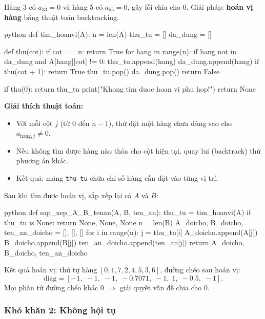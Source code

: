\documentclass[12pt,a4paper]{article}
\begin{document}
Hàng 3 có $a_{33}=0$ và hàng 5 có $a_{55}=0$, gây lỗi chia cho 0. Giải pháp: \textbf{hoán vị hàng} bằng thuật toán backtracking.

\begin{mintedbox}{python}
def tim_hoanvi(A):
    n = len(A)
    thu_tu = []
    da_dung = []

    def thu(cot):
        if cot == n:
            return True
        for hang in range(n):
            if hang not in da_dung and A[hang][cot] != 0:
                thu_tu.append(hang)
                da_dung.append(hang)
                if thu(cot + 1):
                    return True
                thu_tu.pop()
                da_dung.pop()
        return False

    if thu(0):
        return thu_tu
    print("Khong tim duoc hoan vi phu hop!")
    return None
\end{mintedbox}

\textbf{Giải thích thuật toán:}
\begin{itemize}
    \item Với mỗi cột $j$ (từ 0 đến $n-1$), thử đặt một hàng chưa dùng sao cho $a_{\text{hàng},j}\neq 0$.
    \item Nếu không tìm được hàng nào thỏa cho cột hiện tại, quay lui (backtrack) thử phương án khác.
    \item Kết quả: mảng \texttt{thu\_tu} chứa chỉ số hàng cần đặt vào từng vị trí.
\end{itemize}

Sau khi tìm được hoán vị, sắp xếp lại cả $A$ và $B$:

\begin{mintedbox}{python}
def sap_xep_A_B_tenan(A, B, ten_an):
    thu_tu = tim_hoanvi(A)
    if thu_tu is None:
        return None, None, None
    n = len(B)
    A_doicho, B_doicho, ten_an_doicho = [], [], []
    for i in range(n):
        j = thu_tu[i]
        A_doicho.append(A[j])
        B_doicho.append(B[j])
        ten_an_doicho.append(ten_an[j])
    return A_doicho, B_doicho, ten_an_doicho
\end{mintedbox}

Kết quả hoán vị: thứ tự hàng $[0, 1, 7, 2, 4, 5, 3, 6]$, đường chéo sau hoán vị:
\[
    \text{diag} = [-1,\; -1,\; -1,\; -0.7071,\; -1,\; 1,\; -0.5,\; -1].
\]
Mọi phần tử đường chéo khác 0 $\Rightarrow$ giải quyết vấn đề chia cho 0.

\subsubsection{Khó khăn 2: Không hội tụ}
\end{document}

